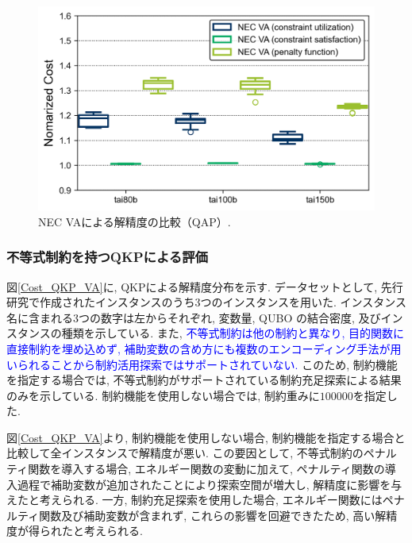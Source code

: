 \documentclass[submit,techrep,noauthor]{ipsj}
\begin{document}
\begin{figure}[tb]
\centering
\includegraphics[bb=0 0 700 230, width=15cm]{Cost_QAP_VA.png}
\caption{NEC VAによる解精度の比較（QAP）.}
\label{Cost_QAP_VA}
\end{figure}

\subsubsection{不等式制約を持つQKPによる評価}
図\ref{Cost_QKP_VA}に, QKPによる解精度分布を示す. データセットとして, 先行研究で作成されたインスタンス\cite{qkplib}のうち3つのインスタンスを用いた. インスタンス名に含まれる3つの数字は左からそれぞれ, 変数量, QUBO の結合密度, 及びインスタンスの種類を示している. また, \textcolor{blue}{不等式制約は他の制約と異なり, 目的関数に直接制約を埋め込めず, 補助変数の含め方にも複数のエンコーディング手法が用いられることから制約活用探索ではサポートされていない.} このため, 制約機能を指定する場合では, 不等式制約がサポートされている制約充足探索による結果のみを示している. 制約機能を使用しない場合では, 制約重みに$100000$を指定した.

図\ref{Cost_QKP_VA}より, 制約機能を使用しない場合, 制約機能を指定する場合と比較して全インスタンスで解精度が悪い. この要因として, 不等式制約のペナルティ関数を導入する場合, エネルギー関数の変動に加えて, ペナルティ関数の導入過程で補助変数が追加されたことにより探索空間が増大し, 解精度に影響を与えたと考えられる. 一方, 制約充足探索を使用した場合, エネルギー関数にはペナルティ関数及び補助変数が含まれず, これらの影響を回避できたため, 高い解精度が得られたと考えられる.
\end{document}
